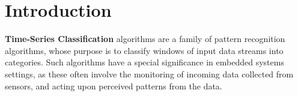 \chapter{Introduction}
\label{ch:introduction}

%
%
%



\textbf{Time-Series Classification} algorithms are a family of pattern recognition algorithms, whose purpose is to classify windows of input data streams into categories.
Such algorithms have a special significance in embedded systems settings, as these often involve the monitoring of incoming data collected from sensors, and acting upon perceived patterns from the data. 

